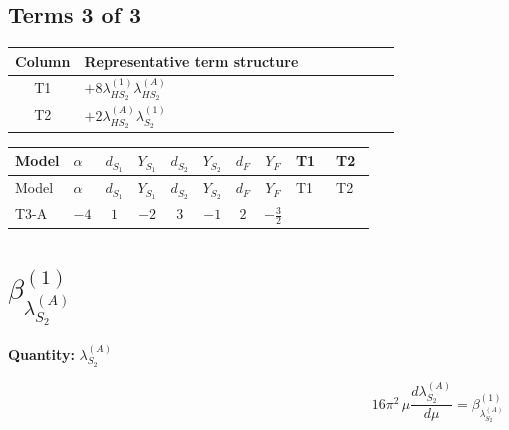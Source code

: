 \documentclass[8pt]{article}
\begin{document}
\begin{landscape}
\subsection*{Terms 3 of 3}
\begin{center}
\begin{tabular}{@{}c >{\raggedright\arraybackslash}p{0.82\linewidth}@{}}
\toprule
Column & Representative term structure \\
\midrule
T1 & \(\displaystyle +8 {\lambda_{HS_2}^{(1)}} {\lambda_{HS_2}^{(A)}}\) \\
\midrule
T2 & \(\displaystyle +2 {\lambda_{HS_2}^{(A)}} {\lambda_{S_2}^{(1)}}\) \\
\midrule
\bottomrule
\end{tabular}
\end{center}
\smallskip
\tiny
\begin{longtable}{@{}llcccccc >{\raggedright\arraybackslash}p{0.21\linewidth} >{\raggedright\arraybackslash}p{0.21\linewidth}@{}}
\toprule
Model & $\alpha$ & $d_{S_1}$ & $Y_{S_1}$ & $d_{S_2}$ & $Y_{S_2}$ & $d_F$ & $Y_F$ & T1 & T2 \\
\midrule
\endfirsthead
\toprule
Model & $\alpha$ & $d_{S_1}$ & $Y_{S_1}$ & $d_{S_2}$ & $Y_{S_2}$ & $d_F$ & $Y_F$ & T1 & T2 \\
\midrule
\endhead
T3-A & $-4$ & $1$ & $-2$ & $3$ & $-1$ & $2$ & $-\frac{3}{2}$ & \scriptsize\adjustbox{max width=\linewidth}{$\begin{gathered} +8 {\lambda_{HS_2}^{(1)}} {\lambda_{HS_2}^{(A)}}\end{gathered}$} & \scriptsize\adjustbox{max width=\linewidth}{$\begin{gathered} +2 {\lambda_{HS_2}^{(A)}} {\lambda_{S_2}^{(1)}}\end{gathered}$} \\
\midrule
\bottomrule
\end{longtable}
\clearpage
\section*{$\beta_{\lambda_{S_2}^{(A)}}^{(1)}$}
\noindent\textbf{Quantity: }$\lambda_{S_2}^{(A)}$\par\smallskip
\[16\pi^2\,\mu\frac{d \lambda_{S_2}^{(A)}}{d\mu}=\beta_{\lambda_{S_2}^{(A)}}^{(1)}\]

\end{landscape}
\end{document}
